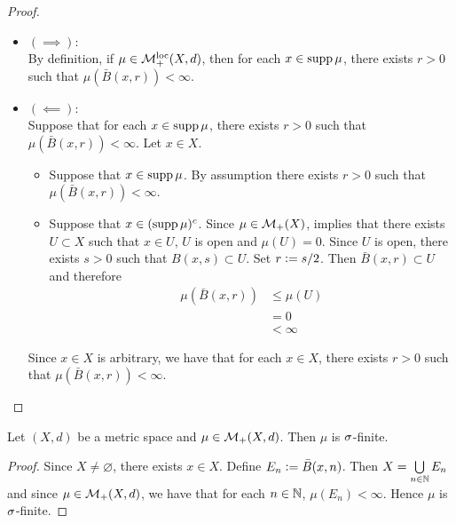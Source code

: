 \documentclass{book}
\begin{document}
	\begin{proof}\
		\begin{itemize}
			\item $(\implies):$ \\
			By definition, if $\mu \in \mathcal{M}_+^{\text{loc}}(X, d)$, then for each $x \in \operatorname{supp} \mu$, there exists $r > 0$ such that $\mu(\bar{B}(x, r)) < \infty$. 
			\item $(\impliedby):$ \\
			Suppose that for each $x \in \operatorname{supp} \mu$, there exists $r > 0$ such that $\mu(\bar{B}(x, r)) < \infty$. Let $x \in X$. 
			\begin{itemize}
				\item Suppose that $x \in \operatorname{supp} \mu$. By assumption there exists $r > 0$ such that $\mu(\bar{B}(x, r)) < \infty$. 
				\item Suppose that $x \in (\operatorname{supp} \mu)^c$. Since $\mu \in \mathcal{M}_+(X)$,  implies that there exists $U \subset X$ such that $x \in U$, $U$ is open and $\mu(U) = 0$. Since $U$ is open, there exists $s > 0$ such that $B(x, s) \subset U$. Set $r \vcentcolon= s/2$. Then $\bar{B}(x, r) \subset U$ and therefore 
				\begin{align*}
					\mu(\bar{B}(x, r))
					& \leq \mu (U) \\
					& = 0 \\
					& < \infty 
				\end{align*}
			\end{itemize}
			Since $x \in X$ is arbitrary, we have that for each $x \in X$, there exists $r > 0$ such that $\mu(\bar{B}(x, r)) < \infty$.
		\end{itemize}
	\end{proof}
	
	\begin{ex} 
		Let $(X, d)$ be a metric space and $\mu \in \mathcal{M}_+(X, d)$. Then $\mu$ is $\sigma$-finite. 
	\end{ex}

	\begin{proof}
		Since $X \neq \varnothing$, there exists $x \in X$. Define $E_n \vcentcolon= \bar{B}(x, n)$. Then $X = \bigcup\limits_{n \in \mathbb{N}} E_n$ and since $\mu \in \mathcal{M}_+(X, d)$, we have that for each $n \in \mathbb{N}$, $\mu(E_n) < \infty$. Hence $\mu$ is $\sigma$-finite.
	\end{proof}
	
\end{document}
